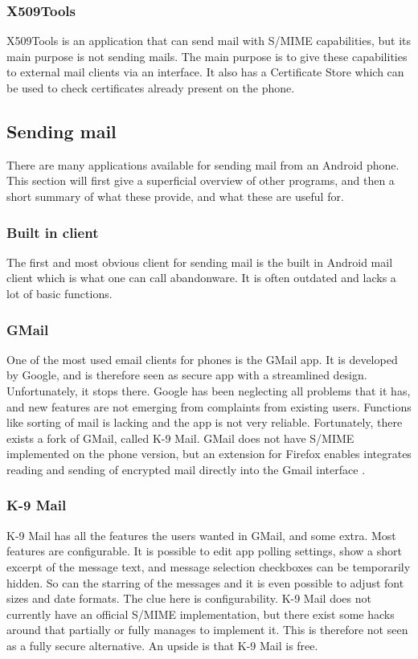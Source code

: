 \subsubsection{X509Tools}
X509Tools is an application that can send mail with S/MIME capabilities, but its main purpose is not sending mails. The main purpose is to give these capabilities to external mail clients via an interface. It also has a Certificate Store which can be used to check certificates already present on the phone. 

\subsection{Sending mail}
There are many applications available for sending mail from an Android phone. This section will first give a superficial overview of other programs, and then a short summary of what these provide, and what these are useful for.

\subsubsection{Built in client}
The first and most obvious client for sending mail is the built in Android mail client which is what one can call abandonware. It is often outdated and lacks a lot of basic functions.

\subsubsection{GMail}
One of the most used email clients for phones is the GMail app. It is developed by Google, and is therefore seen as secure app with a streamlined design. Unfortunately, it stops there. Google has been neglecting all problems that it has, and new features are not emerging from complaints from existing users. Functions like sorting of mail is lacking and the app is not very reliable. Fortunately, there exists a fork of GMail, called K-9 Mail. GMail does not have S/MIME implemented on the phone version, but an extension for Firefox enables integrates reading and sending of encrypted mail directly into the Gmail interface \cite{bib:gmail}.

\subsubsection{K-9 Mail}
K-9 Mail has all the features the users wanted in GMail, and some extra. Most features are configurable. It is possible to edit app polling settings, show a short excerpt of the message text, and message selection checkboxes can be temporarily hidden. So can the starring of the messages and it is even possible to adjust font sizes and date formats. The clue here is configurability. K-9 Mail does not currently have an official S/MIME implementation, but there exist some hacks around that partially or fully manages to implement it. This is therefore not seen as a fully secure alternative. An upside is that K-9 Mail is free.

